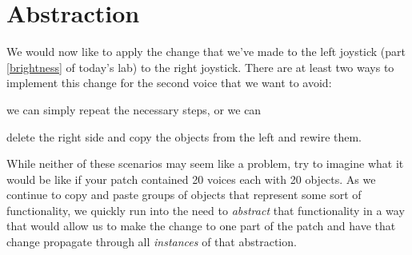 \section{Abstraction}\label{abstraction}

We would now like to apply the change that we've made to the left joystick 
(part \ref{brightness} of today's lab) 
to the right joystick.  There are at least two ways to implement this change 
for the second voice that we want to avoid: 
\begin{inparaenum}[(1)]
\item we can simply repeat the necessary steps, or we can 
\item delete the right side and copy the objects from the left and rewire them.
\end{inparaenum}

While neither of these scenarios may seem like a problem, try to imagine what 
it would be like if your patch contained 20 voices each with 20 objects.  
As we continue to copy and paste groups of objects that represent some sort
of functionality, we quickly run into the need to {\em abstract} that 
functionality in a way that would allow us to make the change to one
part of the patch and have that change propagate through all {\em instances}
of that abstraction.

